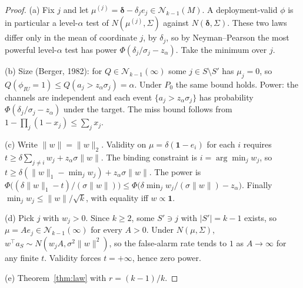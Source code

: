 \documentclass[11pt]{article}
\theoremstyle{definition}
\theoremstyle{remark}
\newcommand{\1}{\mathbf{1}}
\begin{document}
\begin{proof}
(a) Fix $j$ and let $\mu^{(j)}=\bm\delta-\delta_je_j\in\mathcal N_{k-1}(M)$. A deployment-valid $\phi$ is in particular a level-$\alpha$ test of $N(\mu^{(j)},\Sigma)$ against $N(\bm\delta,\Sigma)$. These two laws differ only in the mean of coordinate $j$, by $\delta_j$, so by Neyman--Pearson the most powerful level-$\alpha$ test has power $\Phi(\delta_j/\sigma_j-z_\alpha)$. Take the minimum over $j$.

(b) Size (Berger, 1982): for $Q\in\mathcal N_{k-1}(\infty)$ some $j\in S\setminus S'$ has $\mu_j=0$, so $Q(\phi_{IU}=1)\le Q(a_j>z_\alpha\sigma_j)=\alpha$. Under $P_0$ the same bound holds. Power: the channels are independent and each event $\{a_j>z_\alpha\sigma_j\}$ has probability $\Phi(\delta_j/\sigma_j-z_\alpha)$ under the target. The miss bound follows from $1-\prod_j(1-x_j)\le\sum_jx_j$.

(c) Write $\|w\|=\|w\|_2$. Validity on $\mu=\delta(\1-e_i)$ for each $i$ requires $t\ge\delta\sum_{j\ne i}w_j+z_\alpha\sigma\|w\|$. The binding constraint is $i=\arg\min_jw_j$, so $t\ge\delta(\|w\|_1-\min_jw_j)+z_\alpha\sigma\|w\|$. The power is $\Phi\big((\delta\|w\|_1-t)/(\sigma\|w\|)\big)\le\Phi\big(\delta\min_jw_j/(\sigma\|w\|)-z_\alpha\big)$. Finally $\min_jw_j\le\|w\|/\sqrt k$, with equality iff $w\propto\1$.

(d) Pick $j$ with $w_j>0$. Since $k\ge2$, some $S'\ni j$ with $|S'|=k-1$ exists, so $\mu=Ae_j\in\mathcal N_{k-1}(\infty)$ for every $A>0$. Under $N(\mu,\Sigma)$, $w^\top a_S\sim N(w_jA,\sigma^2\|w\|^2)$, so the false-alarm rate tends to $1$ as $A\to\infty$ for any finite $t$. Validity forces $t=+\infty$, hence zero power.

(e) Theorem~\ref{thm:law} with $r=(k-1)/k$.
\end{proof}
\end{document}
